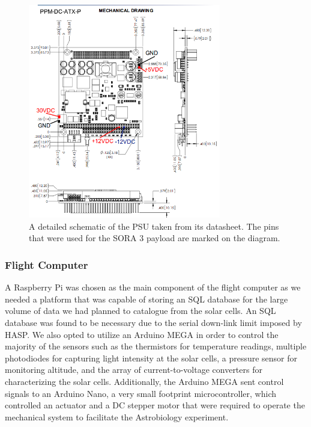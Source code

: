 \begin{figure}[h!]
	\begin{center}
		\includegraphics[width=0.75\textwidth]{figures/psu-pins.png}
		\caption{A detailed schematic of the PSU taken from its datasheet. The pins that were used for the SORA 3 payload are marked on the diagram.}
		\label{fig:psu-outputs}
	\end{center}
\end{figure}

\subsubsection{Flight Computer}
A Raspberry Pi was chosen as the main component of the flight computer as we needed a platform that was capable of storing an SQL database for the large volume of data we had planned to catalogue from the solar cells. An SQL database was found to be necessary due to the serial down-link limit imposed by HASP. We also opted to utilize an Arduino MEGA in order to control the majority of the sensors such as the thermistors for temperature readings, multiple photodiodes for capturing light intensity at the solar cells, a pressure sensor for monitoring altitude, and the array of current-to-voltage converters for characterizing the solar cells. Additionally, the Arduino MEGA sent control signals to an Arduino Nano, a very small footprint microcontroller, which controlled an actuator and a DC stepper motor that were required to operate the mechanical system to facilitate the Astrobiology experiment.


